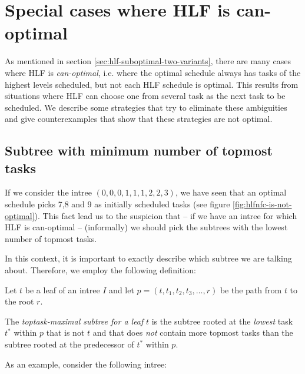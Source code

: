 \section{Special cases where HLF is can-optimal}
\label{sec:suboptimal-hlf-can-optimal-strategies}

As mentioned in section \ref{sec:hlf-suboptimal-two-variants}, there are many cases where HLF is \emph{can-optimal}, i.e. where the optimal schedule always has tasks of the highest levels scheduled, but not each HLF schedule is optimal. This results from situations where HLF can choose one from several task as the next task to be scheduled. We describe some strategies that try to eliminate these ambiguities and give counterexamples that show that these strategies are not optimal.

\subsection{Subtree with minimum number of topmost tasks}
\label{sec:suboptimal-hlf-can-optimal-subtree-fewest-toptasks}

If we consider the intree $(0,0,0,1,1,1,2,2,3)$, we have seen that an optimal schedule picks 7,8 and 9 as initially scheduled tasks (see figure \ref{fig:hlfnfc-is-not-optimal}). This fact lead us to the suspicion that -- if we have an intree for which HLF is can-optimal -- (informally) we should pick the subtrees with the lowest number of topmost tasks. 

In this context, it is important to exactly describe which subtree we are talking about. Therefore, we employ the following definition:

\begin{definition}
  Let $t$ be a leaf of an intree $I$ and let $p=(t, t_1, t_2, t_3, \dots, r)$ be the path from $t$ to the root $r$.

  The \emph{toptask-maximal subtree for a leaf} $t$ is the subtree rooted at the \emph{lowest} task $t^*$ within $p$ that is not $t$ and that does \emph{not} contain more topmost tasks than the subtree rooted at the predecessor of $t^*$ within $p$.
\end{definition}

As an example, consider the following intree:

